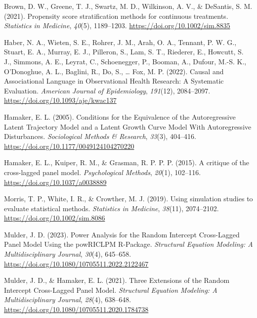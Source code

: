 \documentclass[
]{interact}
\newlength{\cslhangindent}
\newlength{\cslentryspacingunit} %
\newenvironment{CSLReferences}[2] %
 {%
  \setlength{\parindent}{0pt}
  \ifodd #1
  \let\oldpar\par
  \def\par{\hangindent=\cslhangindent\oldpar}
  \fi
  \setlength{\parskip}{#2\cslentryspacingunit}
 }%
 {}
\begin{document}
\hypertarget{refs}{}
\begin{CSLReferences}{1}{0}
\leavevmode{}%
Brown, D. W., Greene, T. J., Swartz, M. D., Wilkinson, A. V., \&
DeSantis, S. M. (2021). Propensity score stratification methods for
continuous treatments. \emph{Statistics in Medicine}, \emph{40}(5),
1189--1203. \url{https://doi.org/10.1002/sim.8835}

\leavevmode{}%
Haber, N. A., Wieten, S. E., Rohrer, J. M., Arah, O. A., Tennant, P. W.
G., Stuart, E. A., Murray, E. J., Pilleron, S., Lam, S. T., Riederer,
E., Howcutt, S. J., Simmons, A. E., Leyrat, C., Schoenegger, P., Booman,
A., Dufour, M.-S. K., O'Donoghue, A. L., Baglini, R., Do, S., \ldots{}
Fox, M. P. (2022). Causal and {Associational Language} in {Observational
Health Research}: {A Systematic Evaluation}. \emph{American Journal of
Epidemiology}, \emph{191}(12), 2084--2097.
\url{https://doi.org/10.1093/aje/kwac137}

\leavevmode{}%
Hamaker, E. L. (2005). Conditions for the {Equivalence} of the
{Autoregressive Latent Trajectory Model} and a {Latent Growth Curve
Model With Autoregressive Disturbances}. \emph{Sociological Methods \&
Research}, \emph{33}(3), 404--416.
\url{https://doi.org/10.1177/0049124104270220}

\leavevmode{}%
Hamaker, E. L., Kuiper, R. M., \& Grasman, R. P. P. P. (2015). A
critique of the cross-lagged panel model. \emph{Psychological Methods},
\emph{20}(1), 102--116. \url{https://doi.org/10.1037/a0038889}

\leavevmode{}%
Morris, T. P., White, I. R., \& Crowther, M. J. (2019). Using simulation
studies to evaluate statistical methods. \emph{Statistics in Medicine},
\emph{38}(11), 2074--2102. \url{https://doi.org/10.1002/sim.8086}

\leavevmode{}%
Mulder, J. D. (2023). Power {Analysis} for the {Random Intercept
Cross-Lagged Panel Model Using} the {powRICLPM R-Package}.
\emph{Structural Equation Modeling: A Multidisciplinary Journal},
\emph{30}(4), 645--658.
\url{https://doi.org/10.1080/10705511.2022.2122467}

\leavevmode{}%
Mulder, J. D., \& Hamaker, E. L. (2021). Three {Extensions} of the
{Random Intercept Cross-Lagged Panel Model}. \emph{Structural Equation
Modeling: A Multidisciplinary Journal}, \emph{28}(4), 638--648.
\url{https://doi.org/10.1080/10705511.2020.1784738}


\end{CSLReferences}
\end{document}
